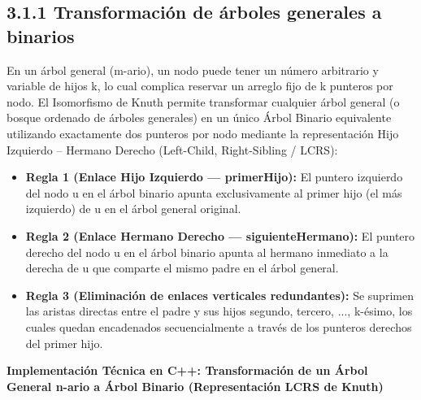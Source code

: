 \documentclass[11pt,letterpaper]{article}
\begin{document}
\subsection*{3.1.1 Transformación de árboles generales a binarios}
En un árbol general (m-ario), un nodo puede tener un número arbitrario y variable de hijos k, lo cual complica reservar un arreglo fijo de k punteros por nodo. El Isomorfismo de Knuth permite transformar cualquier árbol general (o bosque ordenado de árboles generales) en un único Árbol Binario equivalente utilizando exactamente dos punteros por nodo mediante la representación Hijo Izquierdo – Hermano Derecho (Left-Child, Right-Sibling / LCRS):\par
\begin{itemize}
\setlength{\itemsep}{2pt}\setlength{\parskip}{0pt}
  \item \textbf{Regla 1 (Enlace Hijo Izquierdo — primerHijo): }El puntero izquierdo del nodo u en el árbol binario apunta exclusivamente al primer hijo (el más izquierdo) de u en el árbol general original.
  \item \textbf{Regla 2 (Enlace Hermano Derecho — siguienteHermano): }El puntero derecho del nodo u en el árbol binario apunta al hermano inmediato a la derecha de u que comparte el mismo padre en el árbol general.
  \item \textbf{Regla 3 (Eliminación de enlaces verticales redundantes): }Se suprimen las aristas directas entre el padre y sus hijos segundo, tercero, ..., k-ésimo, los cuales quedan encadenados secuencialmente a través de los punteros derechos del primer hijo.
\end{itemize}
\vspace{4pt}\noindent\textbf{\color{ipnblue}Implementación Técnica en C++: Transformación de un Árbol General n-ario a Árbol Binario (Representación LCRS de Knuth)}\par\vspace{-2pt}
\end{document}
